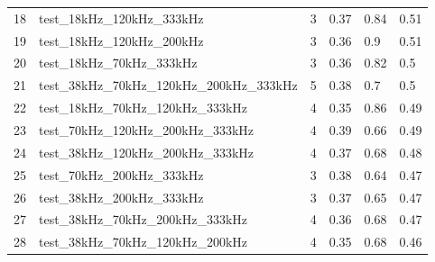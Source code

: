 \begin{longtable}{llllll}
18                     & test\_18kHz\_120kHz\_333kHz                       & 3                        & 0.37                           & 0.84                        & 0.51                           \\
19                     & test\_18kHz\_120kHz\_200kHz                       & 3                        & 0.36                           & 0.9                         & 0.51                           \\
20                     & test\_18kHz\_70kHz\_333kHz                        & 3                        & 0.36                           & 0.82                        & 0.5                            \\
21                     & test\_38kHz\_70kHz\_120kHz\_200kHz\_333kHz        & 5                        & 0.38                           & 0.7                         & 0.5                            \\
22                     & test\_18kHz\_70kHz\_120kHz\_333kHz                & 4                        & 0.35                           & 0.86                        & 0.49                           \\
23                     & test\_70kHz\_120kHz\_200kHz\_333kHz               & 4                        & 0.39                           & 0.66                        & 0.49                           \\
24                     & test\_38kHz\_120kHz\_200kHz\_333kHz               & 4                        & 0.37                           & 0.68                        & 0.48                           \\
25                     & test\_70kHz\_200kHz\_333kHz                       & 3                        & 0.38                           & 0.64                        & 0.47                           \\
26                     & test\_38kHz\_200kHz\_333kHz                       & 3                        & 0.37                           & 0.65                        & 0.47                           \\
27                     & test\_38kHz\_70kHz\_200kHz\_333kHz                & 4                        & 0.36                           & 0.68                        & 0.47                           \\
28                     & test\_38kHz\_70kHz\_120kHz\_200kHz                & 4                        & 0.35                           & 0.68                        & 0.46                           \\

\end{longtable}
